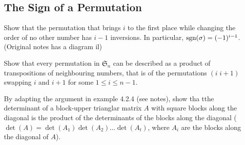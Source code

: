 \subsection{The Sign of a Permutation}
\item Show that the permutation that brings $i$ to the first place while changing the order of no other number has $i-1$ inversions. In particular, $\text{sgn}(\sigma) = (-1)^{i-1}$. (Original notes has a diagram il)
\item Show that every permutation in $\mathfrak{S}_n$ can be described as a product of transpositions of neighbouring numbers, that is of the permutations $(i\;i+1)$ swapping $i$ and $i+1$ for some $1 \le i \le n-1$.
  
\item By adapting the argument in example 4.2.4 (see notes), show tha tthe determinant of a block-upper trianglar matrix $A$ with square blocks along the diagonal is the product of the determinants of the blocks along the diagonal ($\det (A) = \det (A_1) \det (A_2) \dots \det (A_t)$, where $A_i$ are the blocks along the diagonal of $A$).